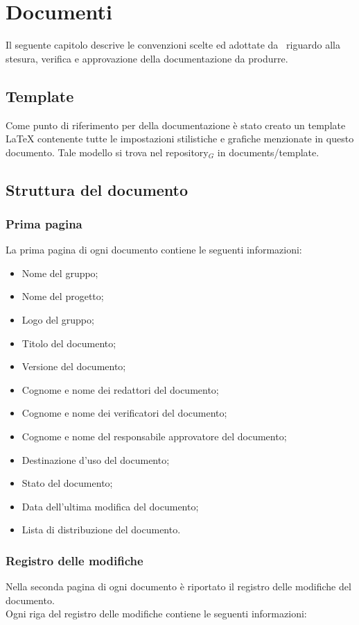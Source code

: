 \section{Documenti}
Il seguente capitolo descrive le convenzioni scelte ed adottate da \gruppo\ riguardo alla stesura, verifica e approvazione della documentazione da produrre.

\subsection{Template}
Come punto di riferimento per della documentazione è stato creato un template \LaTeX{} contenente tutte le impostazioni stilistiche e grafiche menzionate in questo documento. Tale modello si trova nel repository$_{G}$ in documents/template.

\subsection{Struttura del documento}

\subsubsection{Prima pagina}
La prima pagina di ogni documento contiene le seguenti informazioni:
\smallbreak
\begin{itemize}
\item Nome del gruppo;
\item Nome del progetto;
\item Logo del gruppo;
\item Titolo del documento;
\item Versione del documento;
\item Cognome e nome dei redattori del documento;
\item Cognome e nome dei verificatori del documento;
\item Cognome e nome del responsabile approvatore del documento;
\item Destinazione d'uso del documento;
\item Stato del documento;
\item Data dell'ultima modifica del documento;
\item Lista di distribuzione del documento.
\end{itemize}

\subsubsection{Registro delle modifiche}
Nella seconda pagina di ogni documento è riportato il registro delle modifiche del documento. \\ 
Ogni riga del registro delle modifiche contiene le seguenti informazioni:

